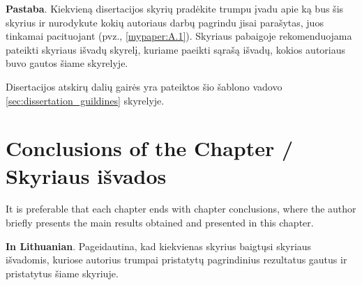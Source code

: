 \textbf{Pastaba}. Kiekvieną disertacijos skyrių pradėkite trumpu įvadu apie ką bus šis skyrius ir nurodykute kokių autoriaus darbų pagrindu jisai parašytas, juos tinkamai pacituojant (pvz., \ref{mypaper:A.1}). Skyriaus pabaigoje rekomenduojama pateikti skyriaus išvadų skyrelį, kuriame paeikti sąrašą išvadų, kokios autoriaus buvo gautos šiame skyrelyje.

Disertacijos atskirų dalių gairės yra pateiktos šio šablono vadovo \ref{sec:dissertation_guildines} skyrelyje.


\section{Conclusions of the Chapter / Skyriaus išvados}
It is preferable that each chapter ends with chapter conclusions, where the author briefly presents the main results obtained and presented in this chapter.

\textbf{In Lithuanian}. Pageidautina, kad kiekvienas skyrius baigtųsi skyriaus išvadomis, kuriose autorius trumpai pristatytų pagrindinius rezultatus gautus ir pristatytus šiame skyriuje.
